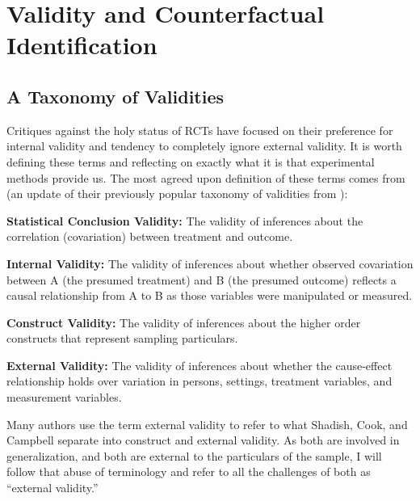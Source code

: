 \documentclass[a4paper,12pt]{article}
\begin{document}




\section{Validity and Counterfactual Identification}

\subsection{A Taxonomy of Validities}

Critiques against the holy status of RCTs have focused on their preference for internal validity and tendency to completely ignore external validity. It is worth defining these terms and reflecting on exactly what it is that experimental methods provide us. The most agreed upon definition of these terms comes from \cite{Shadish2002} (an update of their previously popular taxonomy of validities from \cite{Cook1979}):

\begin{displayquote}
\textbf{Statistical Conclusion Validity:} The validity of inferences about the correlation (covariation) between treatment and outcome.

\textbf{Internal Validity:} The validity of inferences about whether observed covariation between A (the presumed treatment) and B (the presumed outcome) reflects a causal relationship from A to B as those variables were manipulated or measured.

\textbf{Construct Validity:} The validity of inferences about the higher order constructs that represent sampling particulars.
 
\textbf{External Validity:} The validity of inferences about whether the cause-effect relationship holds over variation in persons, settings, treatment variables, and measurement variables.
\end{displayquote}

Many authors use the term external validity to refer to what Shadish, Cook, and Campbell separate into construct and external validity. As both are involved in generalization, and both are external to the particulars of the sample, I will follow that abuse of terminology and refer to all the challenges of both as ``external validity.''
\end{document}
